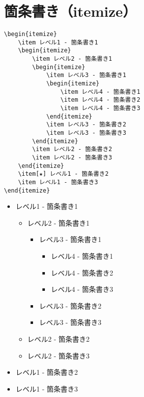 \section{箇条書き（itemize）}

\begin{verbatim}
\begin{itemize}
    \item レベル1 - 箇条書き1
    \begin{itemize}
        \item レベル2 - 箇条書き1
        \begin{itemize}
            \item レベル3 - 箇条書き1
            \begin{itemize}
                \item レベル4 - 箇条書き1
                \item レベル4 - 箇条書き2
                \item レベル4 - 箇条書き3
            \end{itemize}
            \item レベル3 - 箇条書き2
            \item レベル3 - 箇条書き3
        \end{itemize}
        \item レベル2 - 箇条書き2
        \item レベル2 - 箇条書き3
    \end{itemize}
    \item[★] レベル1 - 箇条書き2
    \item レベル1 - 箇条書き3
\end{itemize}
\end{verbatim}

\begin{itemize}
  \item レベル1 - 箇条書き1
    \begin{itemize}
      \item レベル2 - 箇条書き1
        \begin{itemize}
          \item レベル3 - 箇条書き1
            \begin{itemize}
              \item レベル4 - 箇条書き1
              \item レベル4 - 箇条書き2
              \item レベル4 - 箇条書き3
            \end{itemize}
          \item レベル3 - 箇条書き2
          \item レベル3 - 箇条書き3
        \end{itemize}
      \item レベル2 - 箇条書き2
      \item レベル2 - 箇条書き3
    \end{itemize}
  \item レベル1 - 箇条書き2
  \item レベル1 - 箇条書き3
\end{itemize}
